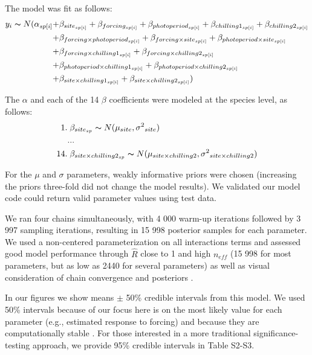 \documentclass[11pt]{article}
\begin{document}
The model was fit as follows:
\begin{align*}
y_i \thicksim N(\alpha_{sp[i]} +& \beta_{site_{sp[i]}} + \beta_{forcing_{sp[i]}} + \beta_{photoperiod_{sp[i]}} + \beta_{chilling1_{sp[i]}} + \beta_{chilling2_{sp[i]}}  \\
	+& \beta_{forcing \times photoperiod_{sp[i]}} + \beta_{forcing \times site_{sp[i]}} + \beta_{photoperiod \times site_{sp[i]}} \\
	+& \beta_{forcing  \times chilling1_{sp[i]}} + \beta_{forcing \times chilling2_{sp[i]}} \\
	+& \beta_{photoperiod \times chilling1_{sp[i]}} + \beta_{photoperiod \times chilling2_{sp[i]}} \\
	+& \beta_{site \times chilling1_{sp[i]}}  + \beta_{site \times chilling2_{sp[i]}} )
\end{align*}

\noindent The $\alpha$ and each of the 14 $\beta$ coefficients were modeled at the species level, as follows:
\begin{align*}
1.& \; \beta_{site_{sp}} \thicksim N(\mu_{site}, \sigma{^2}_{site}) \\
   &... \\
14.& \; \beta_{site \times chilling2_{sp}} \thicksim N(\mu_{site \times chilling2}, \sigma{^2}_{site \times chilling2})
\end{align*}

\noindent For the $\mu$ and $\sigma$ parameters, weakly informative priors were chosen (increasing the priors three-fold did not change the model results). We validated our model code could return valid parameter values using test data. 

We ran four chains simultaneously, with 4 000 warm-up iterations followed by 3 997 sampling iterations, resulting in 15 998 posterior samples for each parameter. We used a non-centered parameterization on all interactions terms and assessed good model performance through $\hat{R}$ close to 1 and high $n_{eff}$ (15 998 for most parameters, but as low as 2440 for several parameters) as well as visual consideration of chain convergence and posteriors \citep{BDA}. 

In our figures we show means $\pm$ 50\% credible intervals from this model. We used 50\% intervals because of our focus here is on the most likely value for each parameter (e.g., estimated response to forcing) and because they are computationally stable \citep{BDA,Carpenter:2016aa}. For those interested in a more traditional significance-testing approach, we provide 95\% credible intervals in Table S2-S3. 
\end{document}
